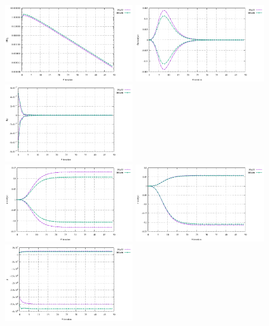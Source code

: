 \begin{center}
\includegraphics[width=5.7cm]{python_codes/fieldstone_87/results/experiment_04/conv}
\includegraphics[width=5.7cm]{python_codes/fieldstone_87/results/experiment_04/du}
\includegraphics[width=5.7cm]{python_codes/fieldstone_87/results/experiment_04/dp}\\
\includegraphics[width=5.7cm]{python_codes/fieldstone_87/results/experiment_04/u}
\includegraphics[width=5.7cm]{python_codes/fieldstone_87/results/experiment_04/v}
\includegraphics[width=5.7cm]{python_codes/fieldstone_87/results/experiment_04/p}
\end{center}

